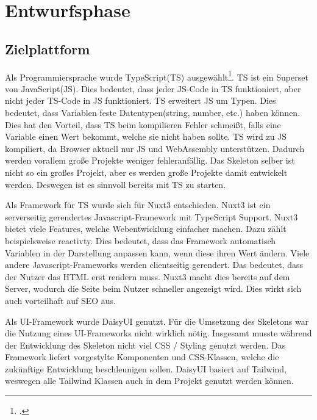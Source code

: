 \section{Entwurfsphase} 
\label{sec:Entwurfsphase}

\subsection{Zielplattform}
\label{sec:Zielplattform}

Als Programmiersprache wurde TypeScript(\acs{TS}) ausgewählt\footnote{\Vgl \citet{TypeScript}.}. \acs{TS} ist ein Superset von JavaScript(\acs{JS}). Dies bedeutet, dass jeder JS-Code in \acs{TS} funktioniert, aber nicht jeder \acs{TS}-Code in JS funktioniert. \acs{TS} erweitert JS um Typen. Dies bedeutet, dass Variablen feste Datentypen(string, number, etc.) haben können. Dies hat den Vorteil, dass \acs{TS} beim kompilieren Fehler schmeißt, falls eine Variable einen Wert bekommt, welche sie nicht haben sollte. \acs{TS} wird zu JS kompiliert, da Browser aktuell nur JS und WebAssembly unterstützen. Dadurch werden vorallem große Projekte weniger fehleranfällig. Das Skeleton selber ist nicht so ein großes Projekt, aber es werden große Projekte damit entwickelt werden. Deswegen ist es sinnvoll bereits mit \acs{TS} zu starten.

Als Framework für TS wurde sich für Nuxt3 entschieden. Nuxt3 ist ein serverseitig gerendertes Javascript-Framework mit TypeScript Support. Nuxt3 bietet viele Features, welche Webentwicklung einfacher machen. Dazu zählt beispielsweise reactivty. Dies bedeutet, dass das Framework automatisch Variablen in der Darstellung anpassen kann, wenn diese ihren Wert ändern. Viele andere Javascript-Frameworks werden clientseitig gerendert. Das bedeutet, dass der Nutzer das HTML erst rendern muss. Nuxt3 macht dies bereits auf dem Server, wodurch die Seite beim Nutzer schneller angezeigt wird. Dies wirkt sich auch vorteilhaft auf SEO aus.

Als UI-Framework wurde DaisyUI genutzt. Für die Umsetzung des Skeletons war die Nutzung eines UI-Frameworks nicht wirklich nötig. Insgesamt musste während der Entwicklung des Skeleton nicht viel CSS / Styling genutzt werden. Das Framework liefert vorgestylte Komponenten und CSS-Klassen, welche die zukünftige Entwicklung beschleunigen sollen. DaisyUI basiert auf Tailwind, weswegen alle Tailwind Klassen auch in dem Projekt genutzt werden können.

